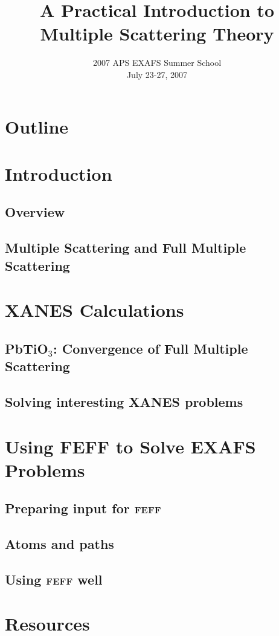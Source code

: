 \documentclass[10pt, xcolor=x11names, compress]{beamer}
\title{A Practical Introduction to Multiple Scattering Theory}
\date[APS EXAFS 07]{2007 APS EXAFS Summer School\\July 23-27, 2007}
\newcommand{\pto}{PbTiO$_3$}
\begin{document}
\begin{frame}
  \titlepage
\end{frame}




\section*{Outline}
\begin{frame}
  \tableofcontents
\end{frame}


\section[Intro]{Introduction}
\subsection{Overview}

\subsection{Multiple Scattering and Full Multiple Scattering}




\section[XANES]{XANES Calculations}
\subsection[Convergence of XANES]{\pto: Convergence of Full Multiple Scattering}


\subsection[Interesting XANES Problems]{Solving interesting XANES problems}




\section[EXAFS]{Using FEFF to Solve EXAFS Problems}
\subsection[\textsc{feff} input]{Preparing input for \textsc{feff}}

\subsection[Atoms and paths]{Atoms and paths}

\subsection[Good practice]{Using \textsc{feff} well}




\section[Resources]{Resources}

\end{document}
